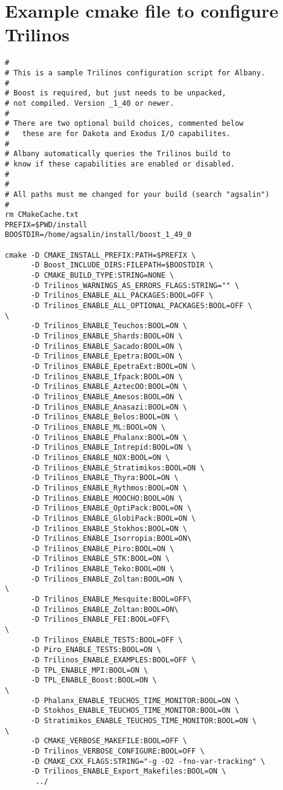 \documentclass[pdf,12pt,report,strict]{SANDreport}
\theoremstyle{remark}
\begin{document}
\section{Example cmake file to configure Trilinos}
\begin{verbatim}
#
# This is a sample Trilinos configuration script for Albany.
#
# Boost is required, but just needs to be unpacked,
# not compiled. Version _1_40 or newer.
#
# There are two optional build choices, commented below
#   these are for Dakota and Exodus I/O capabilites.
#
# Albany automatically queries the Trilinos build to 
# know if these capabilities are enabled or disabled.
#
#
# All paths must me changed for your build (search "agsalin")
#
rm CMakeCache.txt
PREFIX=$PWD/install
BOOSTDIR=/home/agsalin/install/boost_1_49_0

cmake -D CMAKE_INSTALL_PREFIX:PATH=$PREFIX \
      -D Boost_INCLUDE_DIRS:FILEPATH=$BOOSTDIR \
      -D CMAKE_BUILD_TYPE:STRING=NONE \
      -D Trilinos_WARNINGS_AS_ERRORS_FLAGS:STRING="" \
      -D Trilinos_ENABLE_ALL_PACKAGES:BOOL=OFF \
      -D Trilinos_ENABLE_ALL_OPTIONAL_PACKAGES:BOOL=OFF \
\
      -D Trilinos_ENABLE_Teuchos:BOOL=ON \
      -D Trilinos_ENABLE_Shards:BOOL=ON \
      -D Trilinos_ENABLE_Sacado:BOOL=ON \
      -D Trilinos_ENABLE_Epetra:BOOL=ON \
      -D Trilinos_ENABLE_EpetraExt:BOOL=ON \
      -D Trilinos_ENABLE_Ifpack:BOOL=ON \
      -D Trilinos_ENABLE_AztecOO:BOOL=ON \
      -D Trilinos_ENABLE_Amesos:BOOL=ON \
      -D Trilinos_ENABLE_Anasazi:BOOL=ON \
      -D Trilinos_ENABLE_Belos:BOOL=ON \
      -D Trilinos_ENABLE_ML:BOOL=ON \
      -D Trilinos_ENABLE_Phalanx:BOOL=ON \
      -D Trilinos_ENABLE_Intrepid:BOOL=ON \
      -D Trilinos_ENABLE_NOX:BOOL=ON \
      -D Trilinos_ENABLE_Stratimikos:BOOL=ON \
      -D Trilinos_ENABLE_Thyra:BOOL=ON \
      -D Trilinos_ENABLE_Rythmos:BOOL=ON \
      -D Trilinos_ENABLE_MOOCHO:BOOL=ON \
      -D Trilinos_ENABLE_OptiPack:BOOL=ON \
      -D Trilinos_ENABLE_GlobiPack:BOOL=ON \
      -D Trilinos_ENABLE_Stokhos:BOOL=ON \
      -D Trilinos_ENABLE_Isorropia:BOOL=ON\
      -D Trilinos_ENABLE_Piro:BOOL=ON \
      -D Trilinos_ENABLE_STK:BOOL=ON \
      -D Trilinos_ENABLE_Teko:BOOL=ON \
      -D Trilinos_ENABLE_Zoltan:BOOL=ON \
\
      -D Trilinos_ENABLE_Mesquite:BOOL=OFF\
      -D Trilinos_ENABLE_Zoltan:BOOL=ON\
      -D Trilinos_ENABLE_FEI:BOOL=OFF\
\
      -D Trilinos_ENABLE_TESTS:BOOL=OFF \
      -D Piro_ENABLE_TESTS:BOOL=ON \
      -D Trilinos_ENABLE_EXAMPLES:BOOL=OFF \
      -D TPL_ENABLE_MPI:BOOL=ON \
      -D TPL_ENABLE_Boost:BOOL=ON \
\
      -D Phalanx_ENABLE_TEUCHOS_TIME_MONITOR:BOOL=ON \
      -D Stokhos_ENABLE_TEUCHOS_TIME_MONITOR:BOOL=ON \
      -D Stratimikos_ENABLE_TEUCHOS_TIME_MONITOR:BOOL=ON \
\
      -D CMAKE_VERBOSE_MAKEFILE:BOOL=OFF \
      -D Trilinos_VERBOSE_CONFIGURE:BOOL=OFF \
      -D CMAKE_CXX_FLAGS:STRING="-g -O2 -fno-var-tracking" \
      -D Trilinos_ENABLE_Export_Makefiles:BOOL=ON \
       ../


\end{verbatim}
\end{document}
